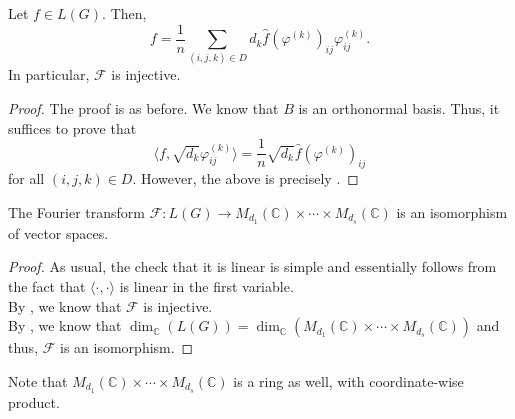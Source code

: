 \documentclass[12pt]{article}	%
\begin{document}
\begin{thm} \label{thm:fourierinvgen}
    Let $f \in L(G).$ Then,
    \begin{equation*} 
        f = \frac{1}{n}\sum_{(i, j, k) \in D}d_k \widehat{f}(\varphi^{(k)})_{ij} \varphi^{(k)}_{ij}.    
    \end{equation*}
    In particular, $\mathcal{F}$ is injective.
\end{thm}
\begin{proof} 
    The proof is as before. We know that $B$ is an orthonormal basis. Thus, it suffices to prove that
    \begin{equation*} 
        \langle f, \sqrt{d_k}\varphi^{(k)}_{ij}\rangle = \frac{1}{n}\sqrt{d_k} \widehat{f}(\varphi^{(k)})_{ij}
    \end{equation*}
    for all $(i, j, k) \in D.$ However, the above is precisely .
\end{proof}

\begin{thm}
    The Fourier transform $\mathcal{F} : L(G) \to M_{d_1}(\mathbb{C}) \times \cdots \times M_{d_s}(\mathbb{C})$ is an isomorphism of vector spaces.
\end{thm}
\begin{proof} 
    As usual, the check that it is linear is simple and essentially follows from the fact that $\langle \cdot , \cdot \rangle$ is linear in the first variable. \\
    By , we know that $\mathcal{F}$ is injective. \\
    By , we know that $\dim_{\mathbb{C}}(L(G)) = \dim_{\mathbb{C}}(M_{d_1}(\mathbb{C}) \times \cdots \times M_{d_s}(\mathbb{C}))$ and thus, $\mathcal{F}$ is an isomorphism.
\end{proof}

Note that $M_{d_1}(\mathbb{C}) \times \cdots \times M_{d_s}(\mathbb{C})$ is a ring as well, with coordinate-wise product.
\end{document}
